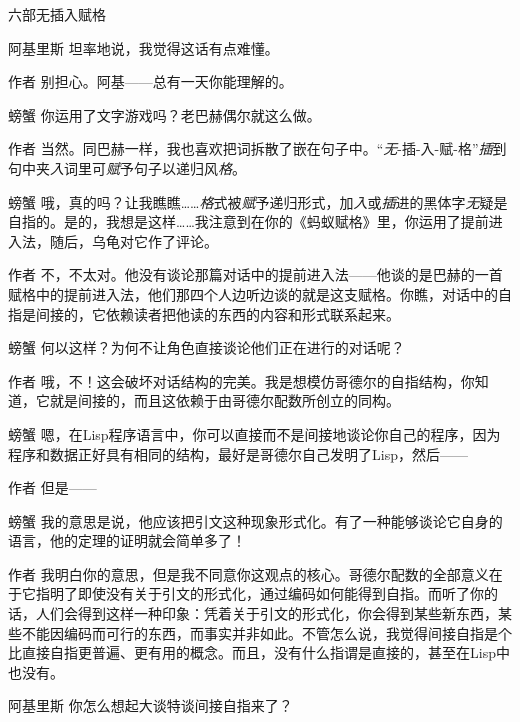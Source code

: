 \begin{dialog}{六部无插入赋格}
\begin{dialogue}
\item[阿基里斯]坦率地说，我觉得这话有点难懂。

\item[作者]别担心。阿基——总有一天你能理解的。

\item[螃蟹]你运用了文字游戏吗？老巴赫偶尔就这么做。

\item[作者]当然。同巴赫一样，我也喜欢把词拆散了嵌在句子中。“\emph{无}-插-入-赋-格”\emph{插}到句中夹\emph{入}词里可\emph{赋}予句子以递归风\emph{格}。

\item[螃蟹]哦，真的吗？让我瞧瞧……\emph{格}式被\emph{赋}予递归形式，加\emph{入}或\emph{插}进的黑体字\emph{无}疑是自指的。是的，我想是这样……我注意到在你的《蚂蚁赋格》里，你运用了提前进入法，随后，乌龟对它作了评论。

\item[作者]不，不太对。他没有谈论那篇对话中的提前进入法——他谈的是巴赫的一首赋格中的提前进入法，他们那四个人边听边谈的就是这支赋格。你瞧，对话中的自指是间接的，它依赖读者把他读的东西的内容和形式联系起来。

\item[螃蟹]何以这样？为何不让角色直接谈论他们正在进行的对话呢？

\item[作者]哦，不！这会破坏对话结构的完美。我是想模仿哥德尔的自指结构，你知道，它就是间接的，而且这依赖于由哥德尔配数所创立的同构。

\item[螃蟹]嗯，在Lisp程序语言中，你可以直接而不是间接地谈论你自己的程序，因为程序和数据正好具有相同的结构，最好是哥德尔自己发明了Lisp，然后——

\item[作者]但是——

\item[螃蟹]我的意思是说，他应该把引文这种现象形式化。有了一种能够谈论它自身的语言，他的定理的证明就会简单多了！

\item[作者]我明白你的意思，但是我不同意你这观点的核心。哥德尔配数的全部意义在于它指明了即使没有关于引文的形式化，通过编码如何能得到自指。而听了你的话，人们会得到这样一种印象：凭着关于引文的形式化，你会得到某些新东西，某些不能因编码而可行的东西，而事实并非如此。不管怎么说，我觉得间接自指是个比直接自指更普遍、更有用的概念。而且，没有什么指谓是直接的，甚至在Lisp中也没有。

\item[阿基里斯]你怎么想起大谈特谈间接自指来了？


\end{dialogue}
\end{dialog}
